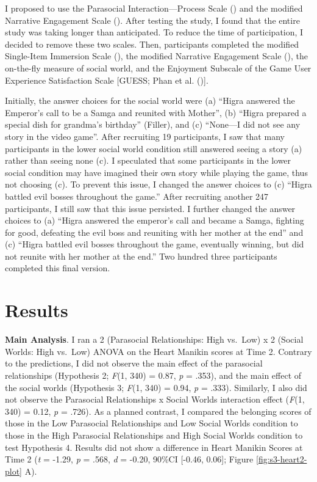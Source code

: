 \documentclass[
]{udthesis}
\begin{document}
I proposed to use the Parasocial Interaction---Process Scale
() and the modified Narrative Engagement
Scale (). After testing the
study, I found that the entire study was taking longer than anticipated.
To reduce the time of participation, I decided to remove these two
scales. Then, participants completed the modified Single-Item Immersion
Scale (), the modified Narrative
Engagement Scale (), the
on-the-fly measure of social world, and the Enjoyment Subscale of the
Game User Experience Satisfaction Scale {[}GUESS;
Phan et al. (){]}.

Initially, the answer choices for the social world were (a) ``Higra
answered the Emperor's call to be a Samga and reunited with Mother'', (b)
``Higra prepared a special dish for grandma's birthday'' (Filler), and (c)
``None---I did not see any story in the video game''. After recruiting
19 participants, I saw that many participants in the lower
social world condition still answered seeing a story (a) rather than
seeing none (c). I speculated that some participants in the lower social
condition may have imagined their own story while playing the game, thus
not choosing (c). To prevent this issue, I changed the answer choices to
(c) ``Higra battled evil bosses throughout the game.'' After recruiting
another 247 participants, I still saw that this issue
persisted. I further changed the answer choices to (a) ``Higra answered
the emperor's call and became a Samga, fighting for good, defeating the
evil boss and reuniting with her mother at the end'' and (c) ``Higra
battled evil bosses throughout the game, eventually winning, but did not
reunite with her mother at the end.''
Two hundred three participants
completed this final version.

\section{Results}\label{results-6}

\textbf{Main Analysis}. I ran a 2 (Parasocial Relationships: High vs.~Low) x
2 (Social Worlds: High vs.~Low) ANOVA on the Heart Manikin scores at
Time 2. Contrary to the predictions, I did not observe the main effect
of the parasocial relationships (Hypothesis 2;
\emph{F}(1, 340) = 0.87, \emph{p} = .353), and the main effect of the social worlds
(Hypothesis 3; \emph{F}(1, 340) = 0.94, \emph{p} = .333). Similarly, I also did not
observe the Parasocial Relationships x Social Worlds interaction effect
(\emph{F}(1, 340) = 0.12, \emph{p} = .726). As a planned contrast, I
compared the belonging scores of those in the Low Parasocial
Relationships and Low Social Worlds condition to those in the High
Parasocial Relationships and High Social Worlds condition to test
Hypothesis 4. Results did not show a difference in Heart Manikin Scores
at Time 2 (\emph{t} = -1.29, \emph{p} = .568, \emph{d} = -0.20, 90\%CI {[}-0.46, 0.06{]}; Figure
\ref{fig:s3-heart2-plot} A).
\end{document}

